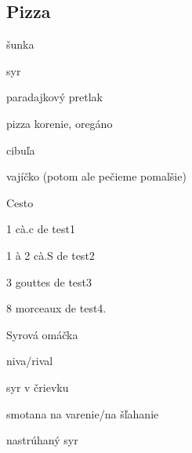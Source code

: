 \setcounter{step}{0}
\subsection{Pizza}

\begin{ingredient}
\begin{main}
	\item šunka
	\item syr
	\item paradajkový pretlak
	\item pizza korenie, oregáno
	\item cibuľa
	\item vajíčko (potom ale pečieme pomalšie)
\end{main}
\begin{subingredient}{Cesto}
	\item 1 cà.c de test1
	\item 1 à 2 cà.S de test2
	\item 3 gouttes de test3
	\item 8 morceaux de test4.	
\end{subingredient}

\begin{subingredient}{Syrová omáčka}
	\item niva/rival
	\item syr v črievku
	\item smotana na varenie/na šľahanie
	\item nastrúhaný syr
\end{subingredient}
\end{ingredient}%
\begin{recipe}




\end{recipe}

\begin{notes}

\end{notes}	